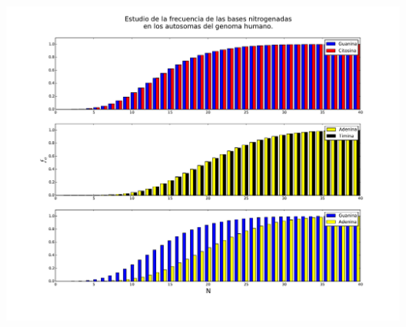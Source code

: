 \documentclass[11pt,letterpaper]{exam}
\begin{document}
\begin{questions}
\begin{center}
	\includegraphics[width=0.99\textwidth]{./bases.pdf}
\end{center}
\end{questions}
\end{document}

